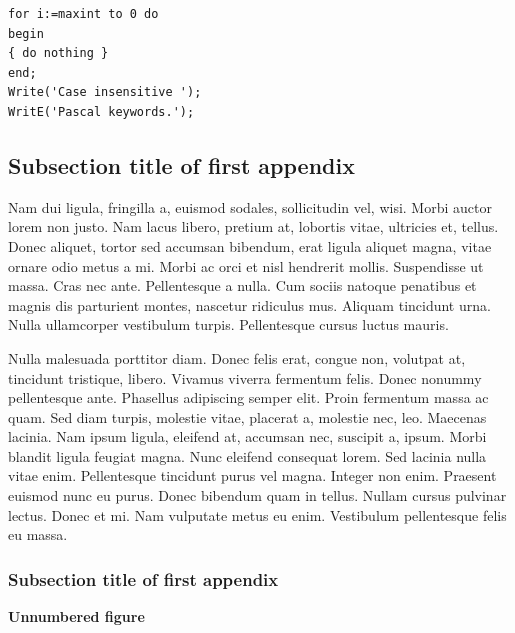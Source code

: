 \documentclass[AMA,STIX1COL]{WileyNJD-SP}
\begin{document}
\begin{lstlisting}[caption={Descriptive Caption Text},label=DescriptiveLabel]
for i:=maxint to 0 do
begin
{ do nothing }
end;
Write('Case insensitive ');
WritE('Pascal keywords.');
\end{lstlisting}



\subsection{Subsection title of first appendix\label{app1.1a}}

Nam dui ligula, fringilla a, euismod sodales, sollicitudin vel, wisi. Morbi auctor lorem non justo. Nam lacus libero,
pretium at, lobortis vitae, ultricies et, tellus. Donec aliquet, tortor sed accumsan bibendum, erat ligula aliquet magna,
vitae ornare odio metus a mi. Morbi ac orci et nisl hendrerit mollis. Suspendisse ut massa. Cras nec ante. Pellentesque
a nulla. Cum sociis natoque penatibus et magnis dis parturient montes, nascetur ridiculus mus. Aliquam tincidunt
urna. Nulla ullamcorper vestibulum turpis. Pellentesque cursus luctus mauris.

Nulla malesuada porttitor diam. Donec felis erat, congue non, volutpat at, tincidunt tristique, libero. Vivamus
viverra fermentum felis. Donec nonummy pellentesque ante. Phasellus adipiscing semper elit. Proin fermentum massa
ac quam. Sed diam turpis, molestie vitae, placerat a, molestie nec, leo. Maecenas lacinia. Nam ipsum ligula, eleifend
at, accumsan nec, suscipit a, ipsum. Morbi blandit ligula feugiat magna. Nunc eleifend consequat lorem. Sed lacinia
nulla vitae enim. Pellentesque tincidunt purus vel magna. Integer non enim. Praesent euismod nunc eu purus. Donec
bibendum quam in tellus. Nullam cursus pulvinar lectus. Donec et mi. Nam vulputate metus eu enim. Vestibulum
pellentesque felis eu massa.

\subsubsection{Subsection title of first appendix\label{app1.1.1a}}

\noindent\textbf{Unnumbered figure}
\end{document}
